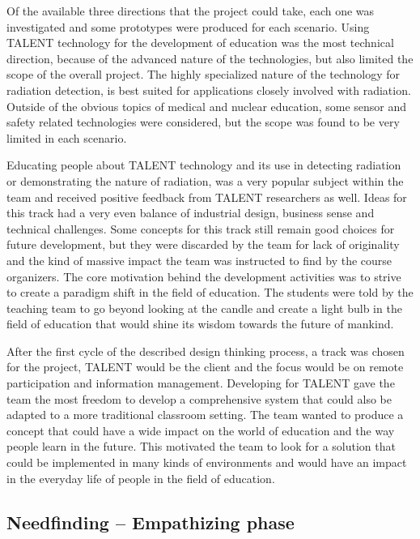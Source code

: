 \documentclass[english,12pt,a4paper,pdftex]{article}
\begin{document}
Of the available three directions that the project could take, each one was investigated and some prototypes were produced for each scenario. Using TALENT technology for the development of education was the most technical direction, because of the advanced nature of the technologies, but also limited the scope of the overall project. The highly specialized nature of the technology for radiation detection, is best suited for applications closely involved with radiation. Outside of the obvious topics of medical and nuclear education, some sensor and safety related technologies were considered, but the scope was found to be very limited in each scenario.

Educating people about TALENT technology and its use in detecting radiation or demonstrating the nature of radiation, was a very popular subject within the team and received positive feedback from TALENT researchers as well. Ideas for this track had a very even balance of industrial design, business sense and technical challenges. Some concepts for this track still remain good choices for future development, but they were discarded by the team for lack of originality and the kind of massive impact the team was instructed to find by the course organizers. The core motivation behind the development activities was to strive to create a paradigm shift in the field of education. The students were told by the teaching team to go beyond looking at the candle and create a light bulb in the field of education that would shine its wisdom towards the future of mankind.

After the first cycle of the described design thinking process, a track was chosen for the project, TALENT would be the client and the focus would be on remote participation and information management. Developing for TALENT gave the team the most freedom to develop a comprehensive system that could also be adapted to a more traditional classroom setting. The team wanted to produce a concept that could have a wide impact on the world of education and the way people learn in the future. This motivated the team to look for a solution that could be implemented in many kinds of environments and would have an impact in the everyday life of people in the field of education.


\subsection{Needfinding -- Empathizing phase}
\end{document}
